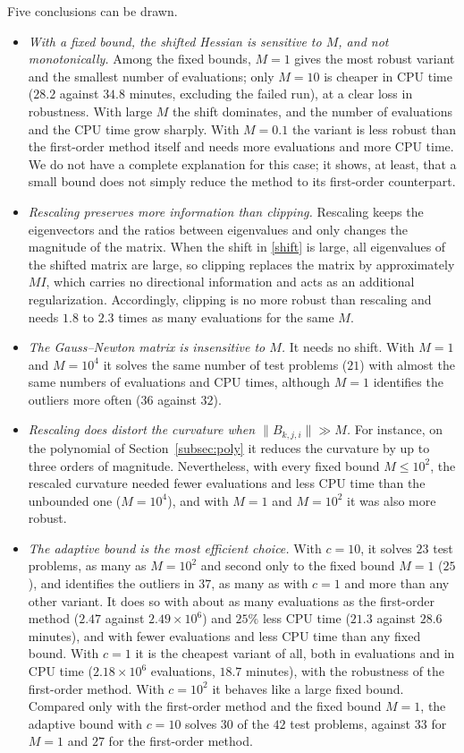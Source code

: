 \documentclass[11pt]{article}
\begin{document}
Five conclusions can be drawn.
\begin{itemize}
\item \emph{With a fixed bound, the shifted Hessian is sensitive to $M$, and not
monotonically.} Among the fixed bounds, $M = 1$ gives the most robust variant
and the smallest number of evaluations; only $M = 10$ is cheaper in CPU time
($28.2$ against $34.8$ minutes, excluding the failed run), at a clear loss in
robustness. With large $M$ the shift dominates, and the number of evaluations
and the CPU time grow sharply. With $M = 0.1$ the variant is less robust than
the first-order method itself and needs more evaluations and more CPU time. We do not have a complete explanation for this
case; it shows, at least, that a small bound does not simply reduce the method
to its first-order counterpart.
\item \emph{Rescaling preserves more information than clipping.} Rescaling
keeps the eigenvectors and the ratios between eigenvalues and only changes the
magnitude of the matrix. When the shift in \eqref{shift} is large, all
eigenvalues of the shifted matrix are large, so clipping replaces the matrix by
approximately $M I$, which carries no directional information and acts as an
additional regularization. Accordingly, clipping is no more robust than
rescaling and needs $1.8$ to $2.3$ times as many evaluations for the same $M$.
\item \emph{The Gauss--Newton matrix is insensitive to $M$.} It needs no
shift. With $M = 1$ and $M = 10^4$ it solves the same number of test problems
($21$) with almost the same numbers of evaluations and CPU times, although
$M = 1$ identifies the outliers more
often ($36$ against $32$).
\item \emph{Rescaling does distort the curvature when $\|B_{k,j,i}\| \gg M$.}
For instance, on the polynomial of Section~\ref{subsec:poly} it reduces the
curvature by up to three orders of magnitude. Nevertheless, with every fixed
bound $M \leq 10^2$, the rescaled curvature needed fewer evaluations and less
CPU time than the unbounded one ($M = 10^4$), and with $M = 1$ and $M = 10^2$
it was also more robust.
\item \emph{The adaptive bound is the most efficient choice.} With $c = 10$, it
solves $23$ test problems, as many as $M = 10^2$ and second only to the fixed
bound $M = 1$ ($25$), and
identifies the outliers in $37$, as many as with $c = 1$ and more than any
other variant. It does so with about as many evaluations as the first-order
method ($2.47$ against $2.49 \times 10^6$) and $25\%$ less CPU time ($21.3$
against $28.6$ minutes), and with fewer evaluations and less CPU time than any
fixed bound. With $c = 1$ it is the cheapest variant of all, both in
evaluations and in CPU time ($2.18 \times 10^6$ evaluations, $18.7$ minutes),
with the
robustness of the first-order method. With $c = 10^2$ it behaves like a large
fixed bound. Compared only with the first-order method and the fixed bound
$M = 1$, the adaptive bound with $c = 10$ solves $30$ of the $42$ test
problems, against $33$ for $M = 1$ and $27$ for the first-order method.
\end{itemize}
\end{document}
